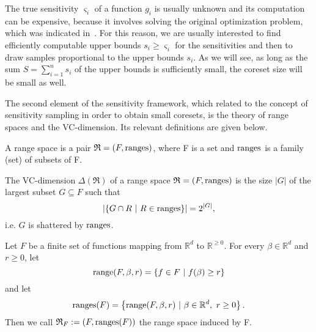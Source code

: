 The true sensitivity $\varsigma_i$ of a function $g_i$ is usually unknown
and its computation can be expensive, because it involves solving the
original optimization problem, which was indicated in~\cite{braverman-feldman-coresets}.
For this reason, we are usually interested to find efficiently computable
upper bounds $s_i \geq \varsigma_i$ for the sensitivities and then
to draw samples proportional to the upper bounds $s_i$.
As we will see, as long as the sum $S = \sum_{i=1}^n s_i$ of the upper
bounds is sufficiently small, the coreset size will be small as well.

The second element of the sensitivity framework, which
\cite{feldman-langberg-coresets} related to the
concept of sensitivity sampling in order to obtain small coresets,
is the theory of range spaces and the VC-dimension.
Its relevant definitions are given below.

\begin{definition}
    A range space is a pair $\mathfrak{R} = (F, \textup{ranges})$, where F is a set
    and $\textup{ranges}$ is a family (set) of subsets of F.
\end{definition}

\begin{definition}
    The VC-dimension $\Delta(\mathfrak{R})$ of a range space
    $\mathfrak{R} = (F, \textup{ranges})$ is
    the size $|G|$ of the largest subset $G \subseteq F$ such that
    \begin{equation*}
        \left| \left\{ G \cap R \ | \ R \in \textup{ranges} \right\} \right|
        = 2^{|G|},
    \end{equation*}
    i.e. $G$ is shattered by $\textup{ranges}$.
\end{definition}

\begin{definition}
    Let $F$ be a finite set of functions mapping from $\mathbb{R}^d$ to $\mathbb{R}^{\geq 0}$.
    For every $\beta \in \mathbb{R}^d$ and $r \geq 0$, let
    \begin{equation*}
        \textup{range}(F, \beta, r) = \left\{ f \in F \ | \  f(\beta) \geq r  \right\}
    \end{equation*}
    and let
    \begin{equation*}
        \textup{ranges}(F) = \left\{ \textup{range}(F, \beta, r) \ | \ \beta \in \mathbb{R}^d, \ r \geq 0  \right\}.
    \end{equation*}
    Then we call $\mathfrak{R}_F := (F, \textup{ranges}(F))$ the range space induced by F.
\end{definition}

